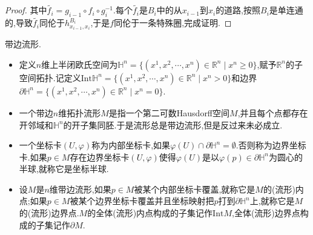 \begin{enumerate}
\begin{proof}
    	其中$\widetilde{f_i}=g_{i-1}\circ f_i\circ g_i^{-1}$.每个$\widetilde{f_i}$是$B_i$中的从$x_{i-1}$到$x_i$的道路,按照$B_i$是单连通的,导致$\widetilde{f_i}$同伦于$h_{x_{i-1},x_i}^{B_i}$,于是$f$同伦于一条特殊圈,完成证明.
    \end{proof}
\end{enumerate}

带边流形.
\begin{itemize}
	\item 定义$n$维上半闭欧氏空间为$\mathbb{H}^n=\{(x^1,x^2,\cdots,x^n)\in\mathbb{R}^n\mid x^n\ge0\}$,赋予$\mathbb{R}^n$的子空间拓扑.记定义$\mathrm{Int}\mathbb{H}^n=\{(x^1,x^2,\cdots,x^n)\in\mathbb{R}^n\mid x^n>0\}$和边界$\partial\mathbb{H}^n=\{(x^1,x^2,\cdots,x^n)\in\mathbb{R}^n\mid x^n=0\}$.
	\item 一个带边$n$维拓扑流形$M$是指一个第二可数Hausdorff空间$M$,并且每个点都存在开邻域和$\mathbb{H}^n$的开子集同胚.于是流形总是带边流形,但是反过来未必成立.
	\item 一个坐标卡$(U,\varphi)$称为内部坐标卡,如果$\varphi(U)\cap\partial\mathbb{H}^n=\emptyset$.否则称为边界坐标卡.如果$p\in M$存在边界坐标卡$(U,\varphi)$使得$\varphi(U)$是以$\varphi(p)\in\partial\mathbb{H}^n$为圆心的半球,就称它是坐标半球.
	\item 设$M$是$n$维带边流形,如果$p\in M$被某个内部坐标卡覆盖,就称它是$M$的(流形)内点;如果$p\in M$被某个边界坐标卡覆盖并且坐标映射把$p$打到$\partial\mathbb{H}^n$上,就称它是$M$的(流形)边界点.$M$的全体(流形)内点构成的子集记作$\mathrm{Int}M$,全体(流形)边界点构成的子集记作$\partial M$.
\end{itemize}
